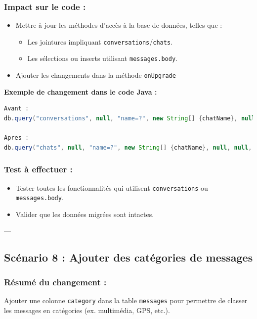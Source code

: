 \documentclass[a4paper,11pt]{article}
\begin{document}
\subsubsection*{Impact sur le code :}
\begin{itemize}
    \item Mettre à jour les méthodes d'accès à la base de données, telles que :
    \begin{itemize}
        \item Les jointures impliquant \texttt{conversations}/\texttt{chats}.
        \item Les sélections ou inserts utilisant \texttt{messages.body}.
    \end{itemize}
    \item  Ajouter les changements  dans la méthode \texttt{onUpgrade}
\end{itemize}

\textbf{Exemple de changement dans le code Java :}
\begin{lstlisting}[language=Java]
Avant :
db.query("conversations", null, "name=?", new String[] {chatName}, null, null, null);

Apres :
db.query("chats", null, "name=?", new String[] {chatName}, null, null, null);
\end{lstlisting}

\subsubsection*{Test à effectuer :}
\begin{itemize}
    \item Tester toutes les fonctionnalités qui utilisent \texttt{conversations} ou \texttt{messages.body}.
    \item Valider que les données migrées sont intactes.
\end{itemize}

---

\subsection*{Scénario 8 : Ajouter des catégories de messages}

\subsubsection*{Résumé du changement :}
Ajouter une colonne \texttt{category} dans la table \texttt{messages} pour permettre de classer les messages en catégories (ex. multimédia, GPS, etc.).
\end{document}
